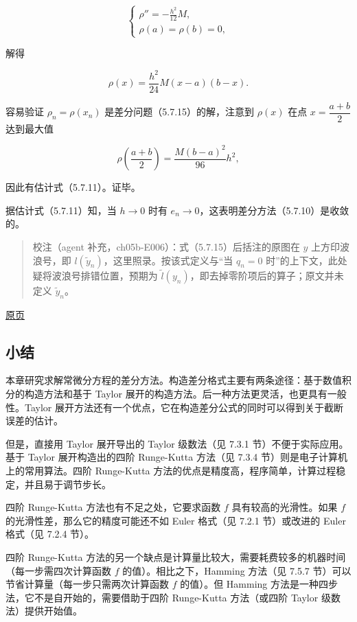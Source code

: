 \documentclass[
  10pt,
  fontset=fandol]{ctexart}
\begin{document}
\[
\begin{cases}
\displaystyle\rho''=-\frac{h^2}{12}M,\\[6pt]
\rho(a)=\rho(b)=0,
\end{cases}
\]

解得

\[
\rho(x)=\frac{h^2}{24}M(x-a)(b-x).
\]

容易验证 \(\rho_n=\rho(x_n)\) 是差分问题（5.7.15）的解，注意到 \(\rho(x)\) 在点 \(x=\dfrac{a+b}2\) 达到最大值

\[
\rho\left(\frac{a+b}2\right)=\frac{M(b-a)^2}{96}h^2,
\]

因此有估计式（5.7.11）。证毕。

据估计式（5.7.11）知，当 \(h\to0\) 时有 \(e_n\to0\)，这表明差分方法（5.7.10）是收敛的。

\begin{quote}
校注（agent 补充，ch05b-E006）：式（5.7.15）后括注的原图在 \(y\) 上方印波浪号，即 \(l(\tilde y_n)\)，这里照录。按该式定义与``当 \(q_n=0\) 时''的上下文，此处疑将波浪号排错位置，预期为 \(\tilde l(y_n)\)，即去掉零阶项后的算子；原文并未定义 \(\tilde y_n\)。
\end{quote}

\href{../../source-images/pdf-153.jpeg}{原页}

\subsection{小结}\label{ux5c0fux7ed3}

本章研究求解常微分方程的差分方法。构造差分格式主要有两条途径：基于数值积分的构造方法和基于 Taylor 展开的构造方法。后一种方法更灵活，也更具有一般性。Taylor 展开方法还有一个优点，它在构造差分公式的同时可以得到关于截断误差的估计。

但是，直接用 Taylor 展开导出的 Taylor 级数法（见 7.3.1 节）不便于实际应用。基于 Taylor 展开构造出的四阶 Runge-Kutta 方法（见 7.3.4 节）则是电子计算机上的常用算法。四阶 Runge-Kutta 方法的优点是精度高，程序简单，计算过程稳定，并且易于调节步长。

四阶 Runge-Kutta 方法也有不足之处，它要求函数 \(f\) 具有较高的光滑性。如果 \(f\) 的光滑性差，那么它的精度可能还不如 Euler 格式（见 7.2.1 节）或改进的 Euler 格式（见 7.2.4 节）。

四阶 Runge-Kutta 方法的另一个缺点是计算量比较大，需要耗费较多的机器时间（每一步需四次计算函数 \(f\) 的值）。相比之下，Hamming 方法（见 7.5.7 节）可以节省计算量（每一步只需两次计算函数 \(f\) 的值）。但 Hamming 方法是一种四步法，它不是自开始的，需要借助于四阶 Runge-Kutta 方法（或四阶 Taylor 级数法）提供开始值。
\end{document}
